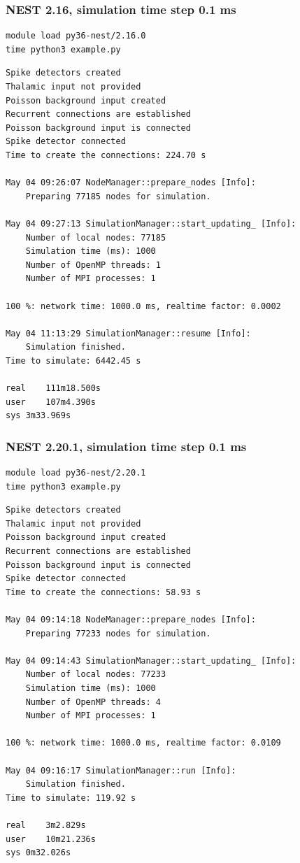 \documentclass[11pt]{scrartcl}
\begin{document}
\subsubsection{NEST 2.16, simulation time step 0.1 ms}
\label{sec:orga82b34c}

\begin{verbatim}
module load py36-nest/2.16.0
time python3 example.py
\end{verbatim}

\begin{verbatim}
Spike detectors created
Thalamic input not provided
Poisson background input created
Recurrent connections are established
Poisson background input is connected
Spike detector connected
Time to create the connections: 224.70 s

May 04 09:26:07 NodeManager::prepare_nodes [Info]: 
    Preparing 77185 nodes for simulation.

May 04 09:27:13 SimulationManager::start_updating_ [Info]: 
    Number of local nodes: 77185
    Simulation time (ms): 1000
    Number of OpenMP threads: 1
    Number of MPI processes: 1

100 %: network time: 1000.0 ms, realtime factor: 0.0002 

May 04 11:13:29 SimulationManager::resume [Info]: 
    Simulation finished.
Time to simulate: 6442.45 s

real	111m18.500s
user	107m4.390s
sys	3m33.969s
\end{verbatim}

\subsubsection{NEST 2.20.1, simulation time step 0.1 ms}
\label{sec:org724c0ce}

\begin{verbatim}
module load py36-nest/2.20.1
time python3 example.py
\end{verbatim}

\begin{verbatim}
Spike detectors created
Thalamic input not provided
Poisson background input created
Recurrent connections are established
Poisson background input is connected
Spike detector connected
Time to create the connections: 58.93 s

May 04 09:14:18 NodeManager::prepare_nodes [Info]: 
    Preparing 77233 nodes for simulation.

May 04 09:14:43 SimulationManager::start_updating_ [Info]: 
    Number of local nodes: 77233
    Simulation time (ms): 1000
    Number of OpenMP threads: 4
    Number of MPI processes: 1

100 %: network time: 1000.0 ms, realtime factor: 0.0109

May 04 09:16:17 SimulationManager::run [Info]: 
    Simulation finished.
Time to simulate: 119.92 s

real	3m2.829s
user	10m21.236s
sys	0m32.026s
\end{verbatim}
\end{document}
